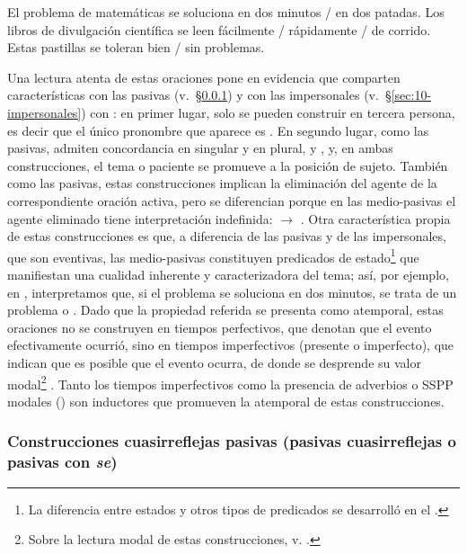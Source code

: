 \begin{exe}
  \ex\label{ex:10-problema} El problema de matemáticas se soluciona en dos
      minutos / en dos patadas.
  \ex\label{ex:10-libros} Los libros de divulgación científica se leen
      fácilmente / rápidamente / de corrido.
  \ex\label{ex:10-pastillas} Estas pastillas se toleran bien / sin problemas.
\end{exe}

Una lectura atenta de estas oraciones pone en evidencia que comparten
características con las pasivas (v.~§\ref{sec:10-pasivas}) y con las
impersonales (v.~§\ref{sec:10-impersonales}) con : en primer lugar,
solo se pueden construir en tercera persona, es decir que el único pronombre que
aparece es . En segundo lugar, como las pasivas, admiten concordancia
en singular  y en plural,  y
, y, en ambas construcciones, el tema o paciente se
promueve a la posición de sujeto. También como las pasivas, estas construcciones
implican la eliminación del agente de la correspondiente oración activa, pero se
diferencian porque en las medio-pasivas el agente eliminado tiene interpretación
indefinida:  $\rightarrow$
. Otra característica propia
de estas construcciones es que, a diferencia de las pasivas y de las
impersonales, que son eventivas, las medio-pasivas constituyen predicados de
estado\footnote{La diferencia entre estados y otros tipos de predicados se
desarrolló en el .} que manifiestan una cualidad inherente y
caracterizadora del tema; así, por ejemplo, en ,
interpretamos que, si el problema se soluciona en dos minutos, se trata de un
problema  o . Dado que la propiedad referida se
presenta como atemporal, estas oraciones no se construyen en tiempos
perfectivos, que denotan que el evento efectivamente ocurrió, sino en tiempos
imperfectivos (presente o imperfecto), que indican que es posible que el evento
ocurra, de donde se desprende su valor modal\footnote{Sobre la lectura modal de
estas construcciones, v. .} \parencite{sanchezlopez2002}. Tanto los
tiempos imperfectivos como la presencia de adverbios o SSPP modales
() son inductores que promueven la
 atemporal de estas construcciones.

\subsubsection{Construcciones cuasirreflejas pasivas (pasivas cuasirreflejas o pasivas con \textit{se})}\label{sec:10-pasivas}

